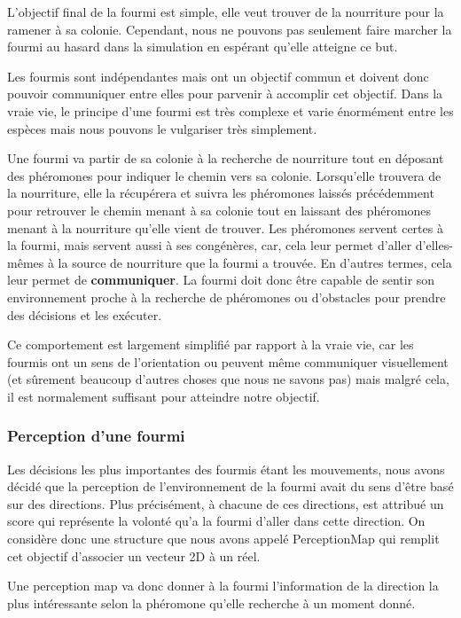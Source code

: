 \documentclass{EPUProjetDi}
\begin{document}
L'objectif final de la fourmi est simple, elle veut trouver de la nourriture pour la ramener à sa colonie. Cependant, nous ne pouvons pas seulement
faire marcher la fourmi au hasard dans la simulation en espérant qu'elle atteigne ce but. 

Les fourmis sont indépendantes mais ont un objectif commun et doivent donc pouvoir communiquer entre elles pour parvenir à accomplir cet objectif.
Dans la vraie vie, le principe d'une fourmi est très complexe et varie énormément entre les espèces mais nous pouvons le vulgariser très simplement.

Une fourmi va partir de sa colonie à la recherche de nourriture tout en déposant des phéromones pour indiquer le chemin vers sa colonie. Lorsqu'elle 
trouvera de la nourriture, elle la récupérera et suivra les phéromones laissés précédemment pour retrouver le chemin menant à sa colonie tout en laissant
des phéromones menant à la nourriture qu'elle vient de trouver.  Les phéromones servent certes à la fourmi, mais servent aussi à ses congénères, car, 
cela leur permet d'aller d'elles-mêmes à la source de nourriture que la fourmi a trouvée. En d'autres termes, cela leur permet de \textbf{communiquer}.
La fourmi doit donc être capable de sentir son environnement proche à la recherche de phéromones ou d'obstacles pour prendre des décisions et les exécuter.

Ce comportement est largement simplifié par rapport à la vraie vie, car les fourmis ont un sens de l'orientation ou peuvent même communiquer visuellement 
(et sûrement beaucoup d'autres choses que nous ne savons pas) mais malgré cela, il est normalement suffisant pour atteindre notre objectif. 

\subsubsection{Perception d'une fourmi}

Les décisions les plus importantes des fourmis étant les mouvements, nous avons décidé que la perception de l'environnement de la fourmi avait du sens
d'être basé sur des directions.
Plus précisément, à chacune de ces directions, est attribué un score qui représente la volonté qu'a la fourmi d'aller dans cette direction.
On considère donc une structure que nous avons appelé PerceptionMap qui remplit cet objectif d'associer un vecteur 2D à un réel.

Une perception map va donc donner à la fourmi l'information de la direction la plus intéressante selon la phéromone qu'elle recherche à un moment donné.
\end{document}
